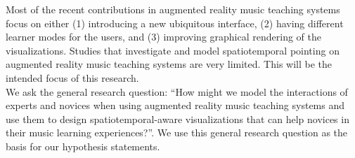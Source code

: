 \documentclass[manuscript,screen]{acmart}
\begin{document}
Most of the recent contributions in augmented reality music teaching systems focus on either (1) introducing a new ubiquitous interface, (2) having different learner modes for the users, and (3) improving graphical rendering of the visualizations. Studies that investigate and model spatiotemporal pointing on augmented reality music teaching systems are very limited. This will be the intended focus of this research. \\
We ask the general research question: “How might we model the interactions of experts and novices when using augmented reality music teaching systems and use them to design spatiotemporal-aware visualizations that can help novices in their music learning experiences?”. We use this general research question as the basis for our hypothesis statements. \\
\end{document}
